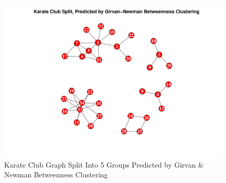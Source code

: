 \documentclass[letterpaper,11pt]{article}
\begin{document}
\begin{figure}[h]
\includegraphics[scale=0.5]{group-of-5.pdf}
\caption{Karate Club Graph Split Into 5 Groups Predicted by Girvan \& Newman Betweenness Clustering}
\label{fig:club-5-split}
\end{figure}


\clearpage


\end{document}
